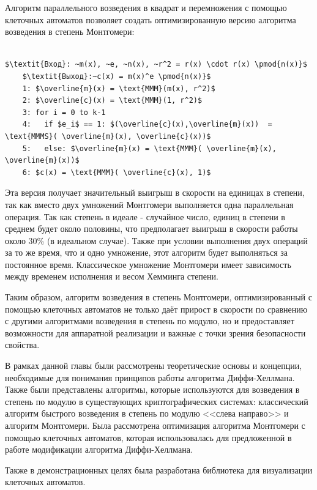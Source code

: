 \documentclass[times,specification,annotation]{itmo-student-thesis}
\begin{document}
Алгоритм параллельного возведения в квадрат и перемножения с помощью клеточных автоматов позволяет создать
оптимизированную версию алгоритма возведения в степень Монтгомери:\\\\
\begin{lstlisting}[breaklines=true, mathescape=true]
    $\textit{Вход}: ~m(x), ~e, ~n(x), ~r^2 = r(x) \cdot r(x) \pmod{n(x)}$
    $\textit{Выход}:~c(x) = m(x)^e \pmod{n(x)}$
    1: $\overline{m}(x) = \text{MMM}(m(x), r^2)$
    2: $\overline{c}(x) = \text{MMM}(1, r^2)$
    3: for i = 0 to k-1
    4:   if $e_i$ == 1: $(\overline{c}(x),\overline{m}(x))  = \text{MMMS}( \overline{m}(x), \overline{c}(x))$
    5:   else: $\overline{m}(x) = \text{MMM}( \overline{m}(x), \overline{m}(x))$
    6: $c(x) = \text{MMM}( \overline{c}(x), 1)$
\end{lstlisting}
Эта версия получает значительный выигрыш в скорости на единицах в степени, так как вместо двух
умножений Монтгомери выполняется одна параллельная операция.
Так как степень в идеале - случайное число, единиц в степени в среднем будет около половины,
что предполагает выигрыш в скорости работы около 30\% (в идеальном случае).
Также при условии выполнения двух операций за то же время, что и одно умножение, этот алгоритм будет выполняться за постоянное время.
Классическое умножение Монтгомери имеет зависимость между временем исполнения и весом Хемминга степени.

Таким образом, алгоритм возведения в степень Монтгомери, оптимизированный с помощью клеточных автоматов не только даёт
прирост в скорости по сравнению с другими алгоритмами возведения в степень по модулю, но и предоставляет возможности
для аппаратной реализации и важные с точки зрения безопасности свойства.

\finishrelatedwork
\chapterconclusion

В рамках данной главы были рассмотрены теоретические основы и концепции, необходимые для понимания принципов работы алгоритма Диффи-Хеллмана.
Также были представлены алгоритмы, которые используются для возведения в степень по модулю в существующих криптографических системах:
классический алгоритм быстрого возведения в степень по модулю <<слева направо>> и алгоритм Монтгомери.
Была рассмотрена оптимизация алгоритма Монтгомери с помощью клеточных автоматов, которая использовалась для предложенной
в работе модификации алгоритма Диффи-Хеллмана.

Также в демонстрационных целях была разработана библиотека для визуализации клеточных автоматов.
\end{document}
